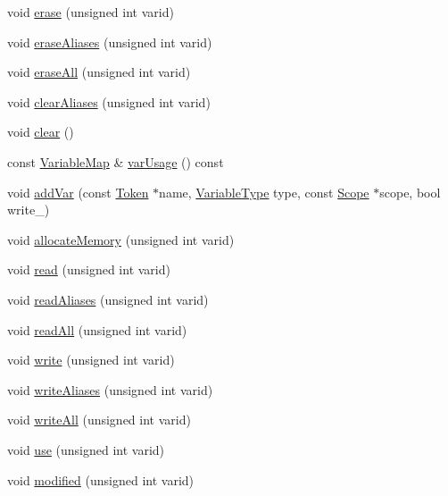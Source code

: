 \begin{DoxyCompactItemize}
\item 
void \hyperlink{class_variables_abcc083a53b7985ca821258bee9ccec2b}{erase} (unsigned int varid)
\item 
void \hyperlink{class_variables_a51f66c181927366ac8b709fc176db1bb}{erase\-Aliases} (unsigned int varid)
\item 
void \hyperlink{class_variables_a71d64b4a85f0e49934d8af564841eb3c}{erase\-All} (unsigned int varid)
\item 
void \hyperlink{class_variables_a8de7aee44a72fc2a30cb6a79fb76ca68}{clear\-Aliases} (unsigned int varid)
\item 
void \hyperlink{class_variables_a46c30050683017ad2e4089a0970eb2a8}{clear} ()
\item 
const \hyperlink{class_variables_ad1842b533d8aea619d93eb5d571e35d0}{Variable\-Map} \& \hyperlink{class_variables_a54742bc6fcef02ce6dad52bc7fe4642b}{var\-Usage} () const 
\item 
void \hyperlink{class_variables_ad94a04ac23e1907c38a84faa8cac6c1b}{add\-Var} (const \hyperlink{class_token}{Token} $\ast$name, \hyperlink{class_variables_a1ce977f31f855a0966511a93b9deb9b6}{Variable\-Type} type, const \hyperlink{class_scope}{Scope} $\ast$scope, bool write\-\_\-)
\item 
void \hyperlink{class_variables_a5a93b5a3558b8f65747ff749c633a757}{allocate\-Memory} (unsigned int varid)
\item 
void \hyperlink{class_variables_ab88a423ae0e238a45ecbdf6f2f21f524}{read} (unsigned int varid)
\item 
void \hyperlink{class_variables_a130e9c0c81697462c7a4599bb501c76d}{read\-Aliases} (unsigned int varid)
\item 
void \hyperlink{class_variables_a37ce07da83cad11a23283211781f480c}{read\-All} (unsigned int varid)
\item 
void \hyperlink{class_variables_a8998a3dfc5cd4e073b67b314c92f59f3}{write} (unsigned int varid)
\item 
void \hyperlink{class_variables_a8216a64a5fba3f0670e56e1321016119}{write\-Aliases} (unsigned int varid)
\item 
void \hyperlink{class_variables_a1d96362c64e76fb698cc855266be4e9a}{write\-All} (unsigned int varid)
\item 
void \hyperlink{class_variables_afcc3acc3af2c1c02f3c9d4668a7f6272}{use} (unsigned int varid)
\item 
void \hyperlink{class_variables_a1c4d49dba6f320283d1b068daad65ba2}{modified} (unsigned int varid)
\item 

\end{DoxyCompactItemize}
